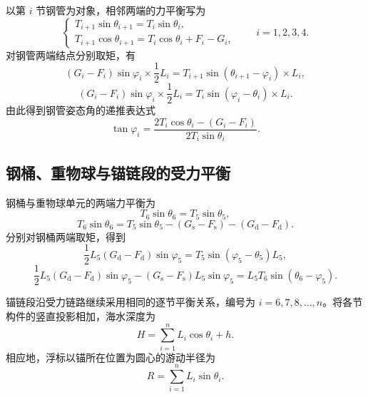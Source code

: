 以第 \(i\) 节钢管为对象，相邻两端的力平衡写为
\begin{equation}
  \begin{cases}
    T_{i+1}\sin\theta_{i+1}=T_i\sin\theta_i,\\[4pt]
    T_{i+1}\cos\theta_{i+1}
    =T_i\cos\theta_i+F_i-G_i,
  \end{cases}
  \qquad i=1,2,3,4.
  \label{eq:q1-pipe-force-balance}
\end{equation}
对钢管两端结点分别取矩，有
\begin{equation}
  (G_i-F_i)\sin\varphi_i\times\frac{1}{2}L_i
  =T_{i+1}\sin(\theta_{i+1}-\varphi_i)\times L_i,
  \label{eq:q1-pipe-moment-upper}
\end{equation}
\begin{equation}
  (G_i-F_i)\sin\varphi_i\times\frac{1}{2}L_i
  =T_i\sin(\varphi_i-\theta_i)\times L_i.
  \label{eq:q1-pipe-moment-lower}
\end{equation}
由此得到钢管姿态角的递推表达式
\begin{equation}
  \tan\varphi_i=
  \frac{2T_i\cos\theta_i-(G_i-F_i)}
  {2T_i\sin\theta_i}.
  \label{eq:q1-pipe-angle}
\end{equation}

\subsection{钢桶、重物球与锚链段的受力平衡}

钢桶与重物球单元的两端力平衡为
\begin{equation}
  T_6\sin\theta_6=T_5\sin\theta_5,
  \label{eq:q1-bucket-horizontal}
\end{equation}
\begin{equation}
  T_6\sin\theta_6
  =T_5\sin\theta_5-(G_{\mathrm s}-F_{\mathrm s})-(G_{\mathrm d}-F_{\mathrm d}).
  \label{eq:q1-bucket-vertical}
\end{equation}
分别对钢桶两端取矩，得到
\begin{equation}
  \frac{1}{2}L_5(G_{\mathrm d}-F_{\mathrm d})\sin\varphi_5
  =T_5\sin(\varphi_5-\theta_5)L_5,
  \label{eq:q1-bucket-moment-upper}
\end{equation}
\begin{equation}
  \frac{1}{2}L_5(G_{\mathrm d}-F_{\mathrm d})\sin\varphi_5
  -(G_{\mathrm s}-F_{\mathrm s})L_5\sin\varphi_5
  =L_5T_6\sin(\theta_6-\varphi_5).
  \label{eq:q1-bucket-moment-lower}
\end{equation}

锚链段沿受力链路继续采用相同的逐节平衡关系，编号为
\(i=6,7,8,\ldots,n\)。将各节构件的竖直投影相加，海水深度为
\begin{equation}
  H=\sum_{i=1}^{n}L_i\cos\theta_i+h.
  \label{eq:q1-water-depth}
\end{equation}
相应地，浮标以锚所在位置为圆心的游动半径为
\begin{equation}
  R=\sum_{i=1}^{n}L_i\sin\theta_i.
  \label{eq:q1-swing-radius}
\end{equation}

